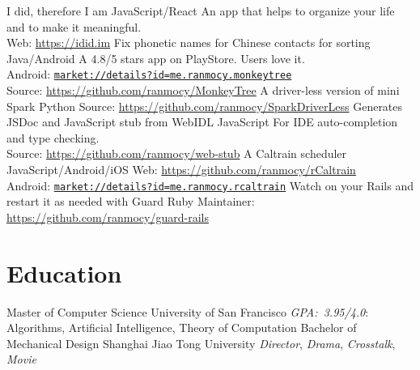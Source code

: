 \documentclass[]{friggeri-cv}
\begin{document}
\begin{entrylist}
  {I did, therefore I am}
  {JavaScript/React}
  {
    An app that helps to organize your life and to make it meaningful.\\
    Web: \url{https://idid.im}
  }
  {Fix phonetic names for Chinese contacts for sorting}
  {Java/Android}
  {
    A 4.8/5 stars app on PlayStore. Users love it.\\
    Android: \href{https://play.google.com/store/apps/details?id=me.ranmocy.monkeytree}{\texttt{market://details?id=me.ranmocy.monkeytree}}\\
    Source: \url{https://github.com/ranmocy/MonkeyTree}
  }
  {A driver-less version of mini Spark}
  {Python}
  {
    Source: \url{https://github.com/ranmocy/SparkDriverLess}
  }
  {Generates JSDoc and JavaScript stub from WebIDL}
  {JavaScript}
  {
    For IDE auto-completion and type checking.\\
    Source: \url{https://github.com/ranmocy/web-stub}
  }
  {A Caltrain scheduler}
  {JavaScript/Android/iOS}
  {
    Web: \url{https://github.com/ranmocy/rCaltrain}\\
    Android: \href{https://play.google.com/store/apps/details?id=me.ranmocy.rcaltrain}{\texttt{market://details?id=me.ranmocy.rcaltrain}}
  }
  {Watch on your Rails and restart it as needed with Guard}
  {Ruby}
  {
    Maintainer: \url{https://github.com/ranmocy/guard-rails}
  }
\end{entrylist}


\section{Education}

\begin{entrylist}
  {Master \textnormal{of Computer Science}}
  {University of San Francisco}
  {
    \emph{GPA:~3.95/4.0}: Algorithms, Artificial Intelligence, Theory of Computation
  }
  {Bachelor \textnormal{of Mechanical Design}}
  {Shanghai Jiao Tong University}
  {
    \emph{Director}, \emph{Drama}, \emph{Crosstalk}, \emph{Movie}
  }
\end{entrylist}
\end{document}
